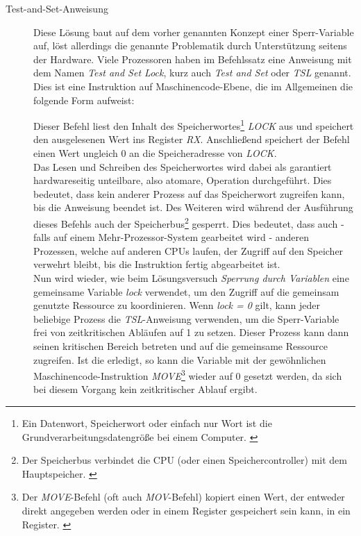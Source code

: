 \begin{description}
\begin{description}
							\item[Test-and-Set-Anweisung]
							
								Diese Lösung baut auf dem vorher genannten Konzept einer Sperr-Variable auf, löst allerdings die genannte Problematik durch Unterstützung seitens der Hardware. Viele Prozessoren haben im Befehlssatz eine Anweisung mit dem Namen \textit{Test and Set Lock}, kurz auch \textit{Test and Set} oder \textit{TSL} genannt. Dies ist eine Instruktion auf Maschinencode-Ebene, die im Allgemeinen die folgende Form aufweist:
								
								
								
								Dieser Befehl liest den Inhalt des Speicherwortes\footnote{Ein Datenwort, Speicherwort oder einfach nur Wort ist die Grundverarbeitungsdatengröße bei einem Computer. \cite{DatenwortWikipedia}} \textit{LOCK} aus und speichert den ausgelesenen Wert ins Register \textit{RX}. Anschließend speichert der Befehl einen Wert ungleich 0 an die Speicheradresse von \textit{LOCK}.\\
								Das Lesen und Schreiben des Speicherwortes wird dabei als garantiert hardwareseitig unteilbare, also atomare, Operation durchgeführt. Dies bedeutet, dass kein anderer Prozess auf das Speicherwort zugreifen kann, bis die Anweisung beendet ist. Des Weiteren wird während der Ausführung dieses Befehls auch der Speicherbus\footnote{Der Speicherbus verbindet die CPU (oder einen Speichercontroller) mit dem Hauptspeicher. \cite{SpeicherbusWikibooks}} gesperrt. Dies bedeutet, dass auch - falls auf einem Mehr-Prozessor-System gearbeitet wird - anderen Prozessen, welche auf anderen CPUs laufen, der Zugriff auf den Speicher verwehrt bleibt, bis die Instruktion fertig abgearbeitet ist.\\
								Nun wird wieder, wie beim Lösungsversuch \textit{Sperrung durch Variablen} eine gemeinsame Variable \textit{lock} verwendet, um den Zugriff auf die gemeinsam genutzte Ressource zu koordinieren. Wenn \textit{lock = 0} gilt, kann jeder beliebige Prozess die \textit{TSL}-Anweisung verwenden, um die Sperr-Variable frei von zeitkritischen Abläufen auf 1 zu setzen. Dieser Prozess kann dann seinen kritischen Bereich betreten und auf die gemeinsame Ressource zugreifen. Ist die erledigt, so kann die Variable mit der gewöhnlichen Maschinencode-Instruktion \textit{MOVE}\footnote{Der \textit{MOVE}-Befehl (oft auch \textit{MOV}-Befehl) kopiert einen Wert, der entweder direkt angegeben werden oder in einem Register gespeichert sein kann, in ein Register. \cite{MoveBefehlWikibooks}} wieder auf 0 gesetzt werden, da sich bei diesem Vorgang kein zeitkritischer Ablauf ergibt.\\

\end{description}
\end{description}
